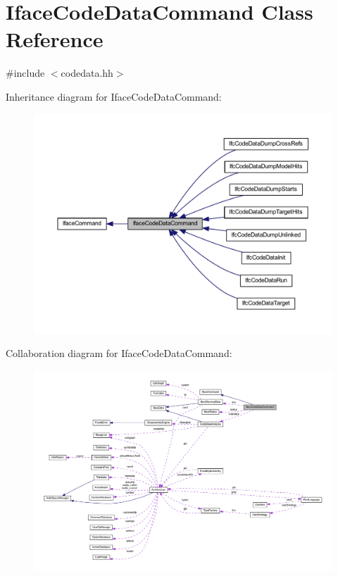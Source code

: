 \hypertarget{class_iface_code_data_command}{}\section{Iface\+Code\+Data\+Command Class Reference}
\label{class_iface_code_data_command}


{\ttfamily \#include $<$codedata.\+hh$>$}



Inheritance diagram for Iface\+Code\+Data\+Command\+:
\nopagebreak
\begin{figure}[H]
\begin{center}
\leavevmode
\includegraphics[width=350pt]{class_iface_code_data_command__inherit__graph}
\end{center}
\end{figure}


Collaboration diagram for Iface\+Code\+Data\+Command\+:
\nopagebreak
\begin{figure}[H]
\begin{center}
\leavevmode
\includegraphics[width=350pt]{class_iface_code_data_command__coll__graph}
\end{center}
\end{figure}
